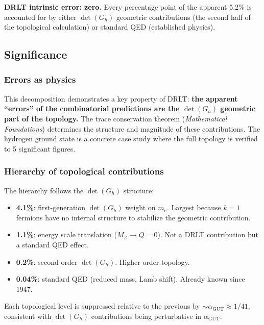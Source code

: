 \documentclass[12pt]{article}
\theoremstyle{remark}
\theoremstyle{definition}
\newcommand{\agut}{\alpha_{\mathrm{GUT}}}
\begin{document}
\textbf{DRLT intrinsic error: zero.} Every percentage point of the apparent 5.2\% is accounted for by either $\det(G_h)$ geometric contributions (the second half of the topological calculation) or standard QED (established physics).

\subsection{Significance}

\subsubsection{Errors as physics}

This decomposition demonstrates a key property of DRLT: \textbf{the apparent ``errors'' of the combinatorial predictions are the $\det(G_h)$ geometric part of the topology.} The trace conservation theorem (\textit{Mathematical Foundations}) determines the structure and magnitude of these contributions. The hydrogen ground state is a concrete case study where the full topology is verified to 5 significant figures.

\subsubsection{Hierarchy of topological contributions}

The hierarchy follows the $\det(G_h)$ structure:
\begin{itemize}
\item \textbf{4.1\%}: first-generation $\det(G_h)$ weight on $m_e$. Largest because $k = 1$ fermions have no internal structure to stabilize the geometric contribution.
\item \textbf{1.1\%}: energy scale translation ($M_Z \to Q = 0$). Not a DRLT contribution but a standard QED effect.
\item \textbf{0.2\%}: second-order $\det(G_h)$. Higher-order topology.
\item \textbf{0.04\%}: standard QED (reduced mass, Lamb shift). Already known since 1947.
\end{itemize}

Each topological level is suppressed relative to the previous by $\sim\!\agut \approx 1/41$, consistent with $\det(G_h)$ contributions being perturbative in $\agut$.
\end{document}
